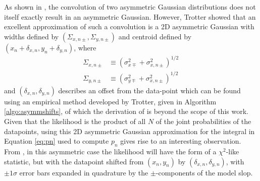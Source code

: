 As shown in \textcite{trotter}, the convolution of two asymmetric Gaussian distributions does not itself exactly result in an asymmetric Gaussian. However, Trotter showed that an excellent approximation of such a convolution is a 2D asymmetric Gaussian with widths defined by $(\Sigma_{x,n\pm}, \Sigma_{y,n\pm})$ and centroid defined by $(x_n+\delta_{x,n}, y_n+\delta_{y,n})$, where
\begin{align}\label{eq:bigsigsasym}
\Sigma_{x,n\pm} & \equiv \left(\sigma_{x\mp}^2 + \sigma_{x,n\pm}^2\right)^{1/2} \nonumber\\
\Sigma_{y,n\pm} & \equiv \left(\sigma_{y\mp}^2 + \sigma_{x,n\pm}^2\right)^{1/2} \,
\end{align}
and $(\delta_{x,n},\delta_{y,n})$ describes an offset from the data-point which can be found using an empirical method developed by Trotter, given in Algorithm \ref{algo:asymmshifts}, of which the derivation of is beyond the scope of this work. Given that the likelihood is the product of all $N$ of the joint probabilities of the datapoints, using this 2D asymmetric Gaussian approximation for the integral in Equation \eqref{eq:pn} used to compute $p_n$ gives rise to an interesting observation. From \textcite{trotter}, in this asymmetric case the likelihood will have the form of a $\chi^2$-like statistic, but with the datapoint shifted from $(x_n,y_n)$ by $(\delta_{x,n},\delta_{y,n})$, with $\pm1\sigma$ error bars expanded in quadrature by the $\pm$-components of the model slop.

